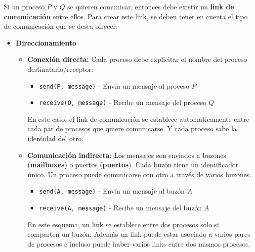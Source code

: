 Si un proceso $P$ y $Q$ se quieren comunicar, entonces debe existir un \textbf{link de comunicación} entre ellos. Para crear este link, se deben tener en cuenta el tipo de comunicación que se desea ofrecer:
\begin{itemize}
	\item \textbf{Direccionamiento}
	\begin{itemize}
		\item \textbf{Conexión directa:} Cada proceso debe explicitar el nombre del proceso destinatario/receptor:
		\begin{itemize}
			\item \texttt{send(P, message)} - Envía un mensaje al proceso $P$
			\item \texttt{receive(Q, message)} - Recibe un mensaje del proceso $Q$
		\end{itemize}

		En este caso, el link de comunicación se establece automáticamente entre cada par de procesos que quiere comunicarse. Y cada proceso sabe la identidad del otro.

		\item \textbf{Comunicación indirecta:} Los mensajes son enviados a buzones (\textbf{mailboxes}) o puertos (\textbf{puertos}). Cada buzón tiene un identificador único. Un proceso puede comunicarse con otro a través de varios buzones.
		\begin{itemize}
			\item \texttt{send(A, message)} - Envía un mensaje al buzón $A$
			\item \texttt{receive(A, message)} - Recibe un mensaje del buzón $A$
		\end{itemize}

		En este esquema, un link se establece entre dos procesos solo si comparten un buzón. Además un link puede estar asociado a varios pares de procesos e incluso puede haber varios links entre dos mismos procesos.


\end{itemize}
\end{itemize}
